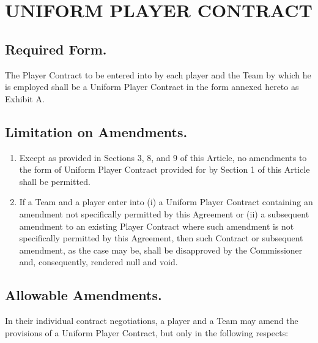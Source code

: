 \documentclass[
]{book}
\providecommand{\tightlist}{%
  \setlength{\itemsep}{0pt}\setlength{\parskip}{0pt}}
\begin{document}
\hypertarget{uniform-player-contract}{%
\chapter{UNIFORM PLAYER CONTRACT}\label{uniform-player-contract}}

\hypertarget{required-form.}{%
\section{Required Form.}\label{required-form.}}

The Player Contract to be entered into by each player and the Team by which he is employed shall be a Uniform Player Contract in the form annexed hereto as Exhibit A.

\hypertarget{limitation-on-amendments.}{%
\section{Limitation on Amendments.}\label{limitation-on-amendments.}}

\begin{enumerate}
\def\labelenumi{(\alph{enumi})}
\tightlist
\item
  Except as provided in Sections 3, 8, and 9 of this Article, no amendments to the form of Uniform Player Contract provided for by Section 1 of this Article shall be permitted.
\item
  If a Team and a player enter into (i) a Uniform Player Contract containing an amendment not specifically permitted by this Agreement or (ii) a subsequent amendment to an existing Player Contract where such amendment is not specifically permitted by this Agreement, then such Contract or subsequent amendment, as the case may be, shall be disapproved by the Commissioner and, consequently, rendered null and void.
\end{enumerate}

\hypertarget{allowable-amendments.}{%
\section{Allowable Amendments.}\label{allowable-amendments.}}

In their individual contract negotiations, a player and a Team may amend the provisions of a Uniform Player Contract, but only in the following respects:
\end{document}
